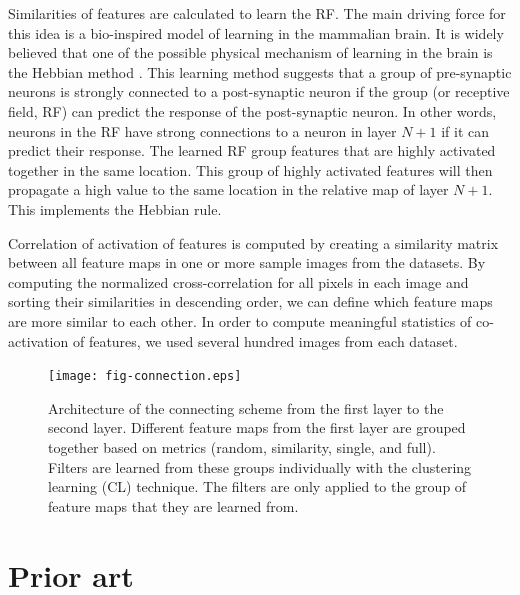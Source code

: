 \documentclass{article} %
\begin{document}
Similarities of features are calculated to learn the RF. 
The main driving force for this idea is a bio-inspired model of learning in the mammalian brain.
It is widely believed that one of the possible physical mechanism of learning in the brain is the Hebbian method \cite{masquelier2007learning}.
This learning method suggests that a group of pre-synaptic neurons is strongly connected to a post-synaptic neuron if the group
(or receptive field, RF) can predict the response of the post-synaptic neuron.
In other words, neurons in the RF have strong connections to a neuron in layer $N+1$ if it can predict their response.
The learned RF group features that are highly activated together in the same location.
This group of highly activated features will then propagate a high value to the same location in the relative map of layer $N+1$.
This implements the Hebbian rule.

Correlation of activation of features is computed by creating a similarity matrix between all feature maps in one or more sample images from the datasets. By computing the normalized cross-correlation for all pixels in each image and sorting their similarities in descending order, we can define which feature maps are more similar to each other. In order to compute meaningful statistics of co-activation of features, we used several hundred images from each dataset.


\begin{figure}
\texttt{[image: fig-connection.eps]}
\caption{Architecture of the connecting scheme from the first layer to the second layer. 
Different feature maps from the first layer are grouped together based on metrics (random, similarity, single, and full). 
Filters are learned from these groups individually with the clustering learning (CL) technique.
The filters are only applied to the group of feature maps that they are learned from.}
\label{fig-learnlayers}
\end{figure}


\section{Prior art}
\label{sec-priorart}
\end{document}
